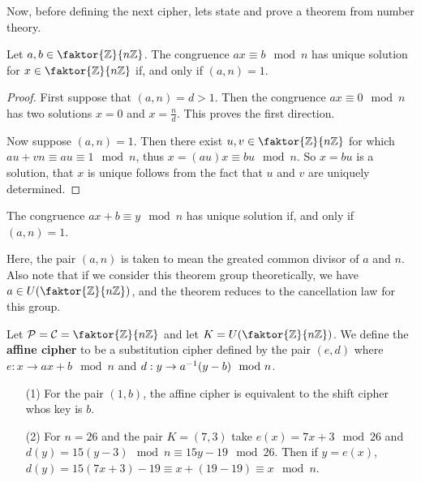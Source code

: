 Now, before defining the next cipher, lets state and prove a theorem from number
theory.

\begin{theorem}\label{1.1.6}
    Let $a,b \in \faktor{\Z}{n\Z}$. The congruence $ax \equiv b \mod{n}$ has
    unique solution for $x \in \faktor{\Z}{n\Z}$ if, and only if $(a,n)=1$.
\end{theorem}
\begin{proof}
    First suppose that $(a,n)=d>1$. Then the congruence $ax \equiv 0 \mod{n}$
    has two solutions $x=0$ and  $x=\frac{n}{d}$. This proves the first
    direction.

    Now suppose $(a,n)=1$. Then there exist $u, v \in \faktor{\Z}{n\Z}$ for
    which $au+vn \equiv au \equiv 1 \mod{n}$, thus $x = (au)x \equiv bu
    \mod{n}$. So $x=bu$ is a solution, that  $x$ is unique follows from the fact
    that  $u$ and  $v$ are uniquely determined.
\end{proof}
\begin{corollary}
    The congruence $ax+b \equiv y \mod{n}$ has unique solution if, and only if
    $(a,n)=1$.
\end{corollary}
\begin{remark}
    Here, the pair $(a,n)$ is taken to mean the greated common divisor of $a$
    and  $n$. Also note that if we consider this theorem group theoretically, we
    have $a \in U(\faktor{\Z}{n\Z})$, and the theorem reduces to the
    cancellation law for this group.
\end{remark}

\begin{definition}
    Let $\Pc=\Cc=\faktor{\Z}{n\Z}$ and let $K=U(\faktor{\Z}{n\Z})$. We define
    the \textbf{affine cipher} to be a substitution cipher defined by the pair
    $(e,d)$ where $e:x \rightarrow ax+b \mod{n}$ and $d:y \rightarrow
    a^{-1}(y-b) \mod{n}$.
\end{definition}

\begin{example}
    \begin{enumerate}
        \item[(1)] For the pair $(1,b)$, the affine cipher is equivalent to the
            shift cipher whos key is $b$.

        \item[(2)] For $n=26$ and the pair $K=(7,3)$ take $e(x)=7x+3 \mod{26}$
            and $d(y)=15(y-3) \mod{n} \equiv 15y-19 \mod{26}$. Then if $y=e(x)$,
            $d(y)=15(7x+3)-19 \equiv x+ (19-19) \equiv x \mod{n}$.
    \end{enumerate}
\end{example}

